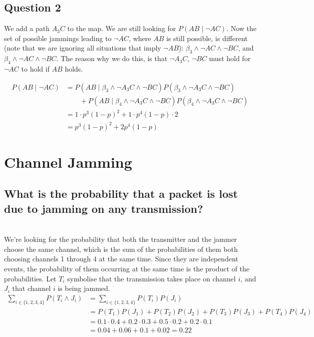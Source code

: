\documentclass{article}
\begin{document}
\subsection*{Question 2}

We add a path $A_3C$ to the map.
We are still looking for $P(AB \mid \neg AC)$.
Now the set of possible jammings leading to $\neg AC$, where $AB$ is still possible, is different (note that we are ignoring all situations that imply $\neg AB$): $\beta_3 \land \neg AC \land \neg BC$, and $\beta_4  \land \neg AC \land \neg BC$.
The reason why we do this, is that $\neg A_3C$, $\neg BC$ must hold for $\neg AC$ to hold if $AB$ holds.

\begin{align*}
P(AB \mid \neg AC) &= P(AB \mid \beta_3 \land \neg A_3C \land \neg BC) P(\beta_3 \land \neg A_3C \land \neg BC) \\
&\qquad + P(AB \mid \beta_4 \land \neg A_3C \land \neg BC) P(\beta_4 \land \neg A_3C \land \neg BC) \\
&= 1 \cdot p^3(1-p)^2 + 1 \cdot p^4(1-p) \cdot 2 \\
&= p^3(1-p)^2 + 2p^4(1-p)
\end{align*}

\newpage
\section{Channel Jamming}
\subsection*{What is the probability that a packet is lost due to jamming on any transmission?} \\
We're looking for the probability that both the transmitter and the jammer choose the same channel, which is the sum of the probabilities of them both choosing channels 1 through 4 at the same time. 
Since they are independent events, the probability of them occurring at the same time is the product of the probabilities.
Let $T_i$ symbolise that the transmission takes place on channel $i$, and $J_i$ that channel $i$ is being jammed.
\begin{align*}
    \sum _ {i \in \{1,2,3,4\}}P(T_i \land  J_i)  &= \sum _ {i \in \{1,2,3,4\}}P(T_i)P( J_i) \\
    &= P(T_1)P(J_1)+P(T_2)P(J_2)+P(T_3)P(J_3)+P(T_4)P(J_4) \\
    &= 0.1\cdot 0.4 + 0.2\cdot 0.3 + 0.5 \cdot 0.2 + 0.2\cdot 0.1 \\
    &= 0.04+0.06+0.1+0.02 = 0.22
\end{align*}
\end{document}
